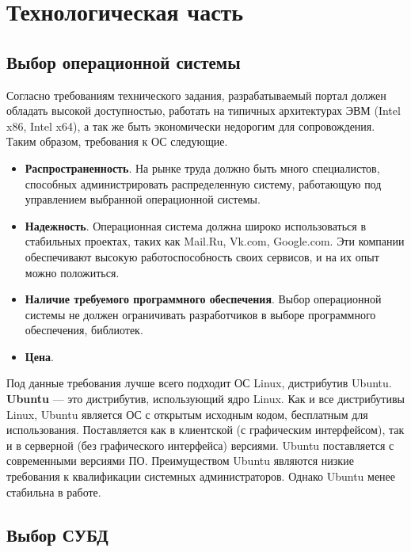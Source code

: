 \chapter{Технологическая часть}

\section{Выбор операционной системы}

Согласно требованиям технического задания, разрабатываемый портал должен обладать высокой доступностью, работать на типичных архитектурах ЭВМ (Intel x86, Intel x64), а так же быть экономически недорогим для сопровождения. Таким образом, требования к ОС следующие.
\begin{itemize}
	\item \textbf{Распространенность}. На рынке труда должно быть много специалистов, способных администрировать распределенную систему, работающую под управлением выбранной операционной системы.
	\item \textbf{Надежность}. Операционная система должна широко использоваться в стабильных проектах, таких как Mail.Ru, Vk.com, Google.com. Эти компании обеспечивают высокую работоспособность своих сервисов, и на их опыт можно положиться.
	\item \textbf{Наличие требуемого программного обеспечения}. Выбор операционной системы не должен ограничивать разработчиков в выборе программного обеспечения, библиотек.
	\item \textbf{Цена}.
\end{itemize}

Под данные требования лучше всего подходит ОС Linux, дистрибутив Ubuntu. \textbf{Ubuntu} \cite{ubuntu} — это дистрибутив, использующий ядро Linux. Как и все дистрибутивы Linux, Ubuntu является ОС с открытым исходным кодом, бесплатным для использования. Поставляется как в клиентской (с графическим интерфейсом), так и в серверной (без графического интерфейса) версиями. Ubuntu поставляется с современными версиями ПО. Преимуществом Ubuntu являются низкие требования к квалификации системных администраторов. Однако Ubuntu менее стабильна в работе.


\section{Выбор СУБД}

